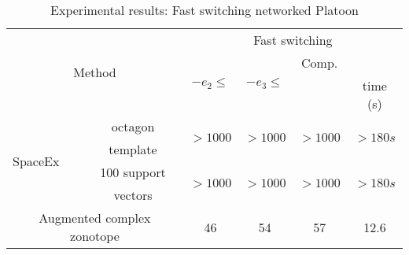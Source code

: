 \begin{table}
\begin{tabular}{|l|c|c|c|c|c|}
\hline
\multicolumn{2}{|c|}{\multirow{4}{*}{Method}} & \multicolumn{4}{|c|}{\multirow{2}{*}{Fast switching}}\\
\multicolumn{2}{|c|}{} & \multicolumn{4}{|c|}{}\\
\cline{3-6}
\multicolumn{2}{|c|}{} & \multirow{2}{*}{$-e_1\leq$} & \multirow{2}{*}{$-e_2\leq$} & \multirow{2}{*}{$-e_3\leq$} & Comp.\\
\multicolumn{2}{|c|}{} & & & & time (s)\\
\hline
\multirow{4}{*}{SpaceEx} & octagon & \multirow{2}{*}{$>1000$} &
\multirow{2}{*}{$>1000$} & \multirow{2}{*}{$>1000$} &
\multirow{2}{*}{$>180s$}\\
& template & & & &\\
\cline{2-6}
& 100 support & \multirow{2}{*}{$>1000$} & \multirow{2}{*}{$>1000$} &
\multirow{2}{*}{$>1000$} & \multirow{2}{*}{$>180s$}\\
& vectors & & & & \\
\hline
\multicolumn{2}{|c|}{\multirow{2}{*}{Augmented complex zonotope}} &
\multirow{2}{*}{46} & \multirow{2}{*}{54} &
\multirow{2}{*}{57} & \multirow{2}{*}{12.6}\\
\multicolumn{2}{|c|}{} & & & & \\
\hline
\end{tabular}
%
\caption{Experimental results: Fast switching networked Platoon}~\label{tab:largedwell-platoon1}
\end{table}

